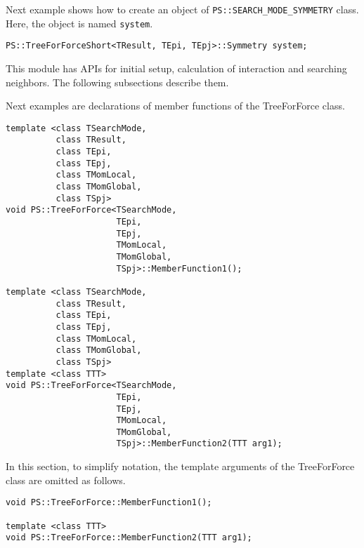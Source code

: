 Next example shows how to create an object of {\tt PS::SEARCH\_MODE\_SYMMETRY} class.  Here, the object is named {\tt system}.

\begin{screen}
\begin{verbatim}
PS::TreeForForceShort<TResult, TEpi, TEpj>::Symmetry system;
\end{verbatim}
\end{screen}


This module has APIs for initial setup, calculation of interaction and searching neighbors. The following subsections describe them.

Next examples are declarations of member functions of the TreeForForce class.

\begin{screen}
\begin{verbatim}
template <class TSearchMode,
          class TResult,
          class TEpi,
          class TEpj,
          class TMomLocal,
          class TMomGlobal,
          class TSpj>
void PS::TreeForForce<TSearchMode,
                      TEpi,
                      TEpj,
                      TMomLocal,
                      TMomGlobal,
                      TSpj>::MemberFunction1();

template <class TSearchMode,
          class TResult,
          class TEpi,
          class TEpj,
          class TMomLocal,
          class TMomGlobal,
          class TSpj>
template <class TTT>
void PS::TreeForForce<TSearchMode,
                      TEpi,
                      TEpj,
                      TMomLocal,
                      TMomGlobal,
                      TSpj>::MemberFunction2(TTT arg1);
\end{verbatim}
\end{screen}

In this section, to simplify notation, the template arguments of the
TreeForForce class are omitted as follows.

\begin{screen}
\begin{verbatim}
void PS::TreeForForce::MemberFunction1();

template <class TTT>
void PS::TreeForForce::MemberFunction2(TTT arg1);
\end{verbatim}
\end{screen}


